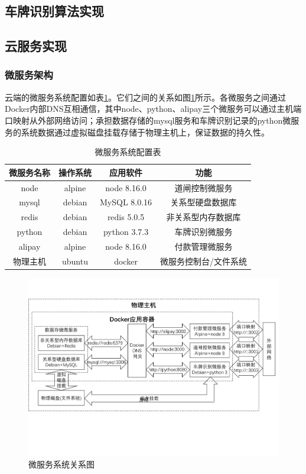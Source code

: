 \documentclass[a4paper]{ctexart}
\begin{document}
\subsection{车牌识别算法实现}\label{车牌识别算法实现}


\subsection{云服务实现}
\subsubsection{微服务架构}
云端的微服务系统配置如表\ref{tab:微服务系统配置表}。它们之间的关系如图\ref{fig:微服务系统关系图}所示。各微服务之间通过Docker内部DNS互相通信，其中node、python、alipay三个微服务可以通过主机端口映射从外部网络访问；承担数据存储的mysql服务和车牌识别记录的python微服务的系统数据通过虚拟磁盘挂载存储于物理主机上，保证数据的持久性。
\begin{table}[htbp]
	\centering
	\caption{微服务系统配置表}
	\begin{tabular}{|c|c|c|c|}
		\hline
		微服务名称 & 操作系统 & 应用软件     & 功能                  \\
		\hline
		node       & alpine   & node 8.16.0  & 道闸控制微服务        \\
		\hline
		mysql      & debian   & MySQL 8.0.16 & 关系型硬盘数据库      \\
		\hline
		redis      & debian   & redis 5.0.5  & 非关系型内存数据库    \\
		\hline
		python     & debian   & python 3.7.3 & 车牌识别微服务        \\
		\hline
		alipay     & alpine   & node 8.16.0  & 付款管理微服务        \\
		\hline
		物理主机   & ubuntu   & docker       & 微服务控制台/文件系统 \\
		\hline
	\end{tabular}
	\label{tab:微服务系统配置表}
\end{table}

\begin{figure}[htbp]
	\centering
	\includegraphics[width=\textwidth]{figure/docker-all.pdf}
	\caption{微服务系统关系图}\label{fig:微服务系统关系图}
\end{figure}
\end{document}
